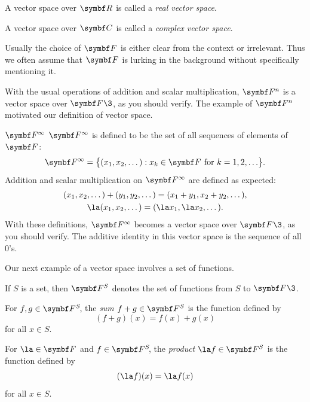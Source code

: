 {\begin{Itemize}
\item
A vector space over $\R{}$ is called a \emph{real vector space}.
\item
A vector space over $\C{}$ is called a \emph{complex vector space}.
\end{Itemize}}

Usually the choice of $\F{}$ is either clear from the context or irrelevant. Thus we often assume that $\F{}$ is lurking in the background without specifically mentioning it.


With the usual operations of addition and scalar multiplication, $\F{n}$ is a vector space over $\F{}\3$, as you should verify.  The example of $\F{n}$ motivated our definition of vector space.

\begin{example}{$\F{\infty}$}
$\F{\infty}$ is defined to be  the set of all sequences of elements of $\F{}$:
\[
\F{\infty} = \br[\big]{ (x_1, x_2, \dotsc) : x_k \in \F{} \mbox{\ for\ } k = 1, 2, \dotsc}.
\]
Addition and scalar multiplication on $\F{\infty}$ are defined as expected:
\begin{gather*}
(x_1, x_2, \dotsc) + (y_1, y_2, \dotsc) = (x_1 + y_1, x_2 + y_2, \dotsc),\\
\la(x_1, x_2, \dotsc) = (\la x_1, \la x_2, \dotsc).
\end{gather*}
With these definitions, $\F{\infty}$ becomes a vector space over $\F{}\3$, as you
should verify.  The additive identity in this vector space is the sequence of all $0$'s.
\end{example}

Our next example of a vector space involves a set of functions.

{\begin{Itemize}
\item
If $S$ is a set, then $\F{S}$ denotes the set of functions from $S$ to $\F{}\3$.
\item
For $f, g \in \FF{S}$, the \emph{sum} $f + g \in \F{S}$ is the function defined by
\[
(f + g)(x) = f(x) + g (x)
\]
for all $x \in S$.
\item
For $\la \in \F{}$ and $f\in \FF{S}$, the \emph{product} $\la f \in \F{S}$ is the function defined by
\[
(\la f)(x) = \la f(x)
\]
for all $x \in S$.
\end{Itemize}}


